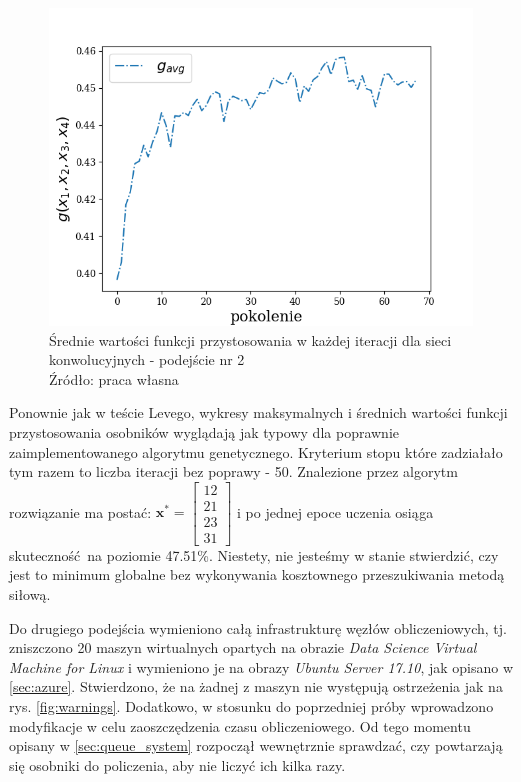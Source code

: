 \begin{figure}[h!tb]
	 \centering
	 \includegraphics[width = 0.9\linewidth]{img/cnn_means}
	 \caption{Średnie wartości funkcji przystosowania w każdej iteracji dla sieci konwolucyjnych - podejście nr 2\\
              Źródło: praca własna}
	 \label{fig:cnn_means}
\end{figure}

Ponownie jak w teście Levego, wykresy maksymalnych i średnich wartości funkcji przystosowania osobników wyglądają jak typowy dla poprawnie zaimplementowanego algorytmu genetycznego.
Kryterium stopu które zadziałało tym razem to liczba iteracji bez poprawy - 50.
Znalezione przez algorytm rozwiązanie ma postać: $\mathbf{x^*} = \begin{bmatrix}12 \\ 21 \\ 23 \\ 31\end{bmatrix}$ i po jednej epoce uczenia osiąga skuteczność na poziomie 47.51\%.
Niestety, nie jesteśmy w stanie stwierdzić, czy jest to minimum globalne bez wykonywania kosztownego przeszukiwania metodą siłową.

Do drugiego podejścia wymieniono całą infrastrukturę węzłów obliczeniowych, tj. zniszczono 20 maszyn wirtualnych opartych na obrazie \textit{Data Science Virtual Machine for Linux} i wymieniono je na obrazy \textit{Ubuntu Server 17.10}, jak opisano w \ref{sec:azure}.
Stwierdzono, że na żadnej z maszyn nie występują ostrzeżenia jak na rys. \ref{fig:warnings}.
Dodatkowo, w stosunku do poprzedniej próby wprowadzono modyfikacje w celu zaoszczędzenia czasu obliczeniowego.
Od tego momentu opisany w \ref{sec:queue_system} rozpoczął wewnętrznie sprawdzać, czy powtarzają się osobniki do policzenia, aby nie liczyć ich kilka razy.

